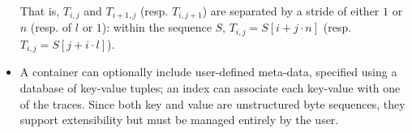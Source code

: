 \documentclass[10pt,a4paper]{llncs}
\begin{document}
\begin{itemize}
      \noindent
      That is, $T_{i,j}$ and $T_{i+1,j}$ (resp. $T_{i,j+1}$) are separated 
      by a stride of either $1$ or $n$ (resp. of $l$ or $1$): within the 
      sequence $S$, $T_{i,j} = S[ i + j \cdot n ]$ (resp. $T_{i,j} = S[ j 
      + i \cdot l ]$).
\item A container can optionally include user-defined meta-data, specified
      using a database of key-value tuples; an index can associate each 
      key-value with one of the traces.  Since both key and value are 
      unstructured byte sequences, they support extensibility but must be 
      managed entirely by the user.
\end{itemize}



\end{document}

